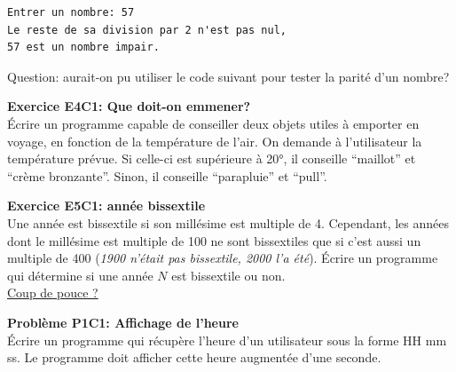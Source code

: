 \documentclass[11pt,french]{article}
\newenvironment{Shaded}{}{}
\newcommand{\DecValTok}[1]{\textcolor[rgb]{0.25,0.63,0.44}{{#1}}}
\newcommand{\StringTok}[1]{\textcolor[rgb]{0.25,0.44,0.63}{{#1}}}
\newcommand{\CommentTok}[1]{\textcolor[rgb]{0.38,0.63,0.69}{\textit{{#1}}}}
\newcommand{\NormalTok}[1]{{#1}}
\newcommand{\ControlFlowTok}[1]{\textcolor[rgb]{0.00,0.44,0.13}{\textbf{{#1}}}}
\newcommand{\OperatorTok}[1]{\textcolor[rgb]{0.40,0.40,0.40}{{#1}}}
\newcommand{\BuiltInTok}[1]{{#1}}
\begin{document}
    \begin{Verbatim}[commandchars=\\\{\}]
Entrer un nombre: 57
Le reste de sa division par 2 n'est pas nul, 
57 est un nombre impair.
    \end{Verbatim}

    Question: aurait-on pu utiliser le code suivant pour tester la parité
d'un nombre?

\begin{Shaded}
\end{Shaded}

 \textbf{Exercice E4C1: Que doit-on emmener?}\\
\'Ecrire un programme capable de conseiller deux objets utiles à emporter
en voyage, en fonction de la température de l'air. On demande à
l'utilisateur la température prévue. Si celle-ci est supérieure à 20°,
il conseille ``maillot'' et ``crème bronzante''. Sinon, il conseille
``parapluie'' et ``pull''.

 \textbf{Exercice E5C1: année bissextile}\\
Une année est bissextile si son millésime est multiple de 4. Cependant,
les années dont le millésime est multiple de 100 ne sont bissextiles que
si c'est aussi un multiple de 400 (\emph{1900 n'était pas bissextile,
2000 l'a été}). \'Ecrire un programme qui détermine si une année \(N\) est
bissextile ou non.\\
\href{./images/bissext.png}{Coup de pouce ?}

\textbf{Problème P1C1: Affichage de l'heure}\\
\'Ecrire un programme qui récupère l'heure d'un utilisateur sous la forme
HH mm ss. Le programme doit afficher cette heure augmentée d'une
seconde.
\end{document}
